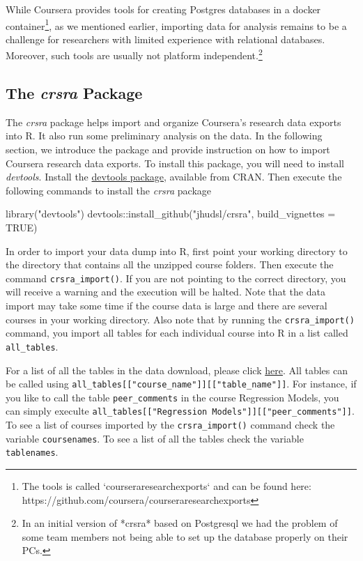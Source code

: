 While Coursera provides tools for creating Postgres databases in a
docker
container\footnote{The tools is called `courseraresearchexports` and can be found here: https://github.com/coursera/courseraresearchexports},
as we mentioned earlier, importing data for analysis remains to be a
challenge for researchers with limited experience with relational
databases. Moreover, such tools are usually not platform
independent.\footnote{In an initial version of *crsra* based on Postgresql we had the problem of some team members not being able to set up the database properly on their PCs.}

\subsection{\texorpdfstring{The \emph{crsra}
Package}{The crsra Package}}\label{the-crsra-package}

The \emph{crsra} package helps import and organize Coursera's research
data exports into R. It also run some preliminary analysis on the data.
In the following section, we introduce the package and provide
instruction on how to import Coursera research data exports. To install
this package, you will need to install \emph{devtools}. Install the
\href{https://CRAN.R-project.org/package=devtools}{devtools package},
available from CRAN. Then execute the following commands to install the
\emph{crsra} package

\begin{Schunk}
\begin{Sinput}
library("devtools")
devtools::install_github("jhudsl/crsra", build_vignettes = TRUE)
\end{Sinput}
\end{Schunk}

In order to import your data dump into R, first point your working
directory to the directory that contains all the unzipped course
folders. Then execute the command \texttt{crsra\_import()}. If you are
not pointing to the correct directory, you will receive a warning and
the execution will be halted. Note that the data import may take some
time if the course data is large and there are several courses in your
working directory. Also note that by running the
\texttt{crsra\_import()} command, you import all tables for each
individual course into R in a list called \texttt{all\_tables}.

For a list of all the tables in the data download, please click
\href{https://github.com/jhudsl/crsra/blob/master/ListofTables.md}{here}.
All tables can be called using
\texttt{all\_tables{[}{[}"course\_name"{]}{]}{[}{[}"table\_name"{]}{]}}.
For instance, if you like to call the table \texttt{peer\_comments} in
the course Regression Models, you can simply execulte
\texttt{all\_tables{[}{[}"Regression\ Models"{]}{]}{[}{[}"peer\_comments"{]}{]}}.
To see a list of courses imported by the \texttt{crsra\_import()}
command check the variable \texttt{coursenames}. To see a list of all
the tables check the variable \texttt{tablenames}.

